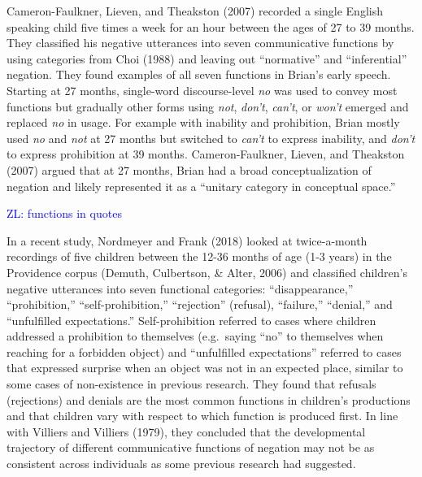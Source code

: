 \documentclass[
  english,
  man,floatsintext]{apa6}
\begin{document}
Cameron-Faulkner, Lieven, and Theakston (2007) recorded a single English speaking child five times a week for an hour between the ages of 27 to 39 months. They classified his negative utterances into seven communicative functions by using categories from Choi (1988) and leaving out ``normative'' and ``inferential'' negation. They found examples of all seven functions in Brian's early speech. Starting at 27 months, single-word discourse-level \emph{no} was used to convey most functions but gradually other forms using \emph{not}, \emph{don't}, \emph{can't}, or \emph{won't} emerged and replaced \emph{no} in usage. For example with inability and prohibition, Brian mostly used \emph{no} and \emph{not} at 27 months but switched to \emph{can't} to express inability, and \emph{don't} to express prohibition at 39 months. Cameron-Faulkner, Lieven, and Theakston (2007) argued that at 27 months, Brian had a broad conceptualization of negation and likely represented it as a ``unitary category in conceptual space.''

\textcolor{blue}{ZL: functions in quotes}

In a recent study, Nordmeyer and Frank (2018) looked at twice-a-month recordings of five children between the 12-36 months of age (1-3 years) in the Providence corpus (Demuth, Culbertson, \& Alter, 2006) and classified children's negative utterances into seven functional categories: ``disappearance,'' ``prohibition,'' ``self-prohibition,'' ``rejection'' (refusal), ``failure,'' ``denial,'' and ``unfulfilled expectations.'' Self-prohibition referred to cases where children addressed a prohibition to themselves (e.g.~saying ``no'' to themselves when reaching for a forbidden object) and ``unfulfilled expectations'' referred to cases that expressed surprise when an object was not in an expected place, similar to some cases of non-existence in previous research. They found that refusals (rejections) and denials are the most common functions in children's productions and that children vary with respect to which function is produced first. In line with Villiers and Villiers (1979), they concluded that the developmental trajectory of different communicative functions of negation may not be as consistent across individuals as some previous research had suggested.
\end{document}
